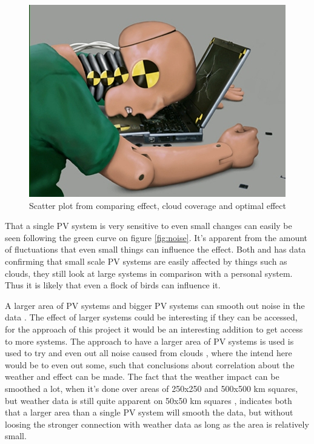 \begin{figure}[h]
  \centering
  \includegraphics{dummy.jpg}
  \caption{Scatter plot from comparing effect, cloud coverage and
    optimal effect}
  \label{fig:fractiles}
\end{figure}


That a single PV system is very sensitive to even small changes can
easily be seen following the green curve on figure \ref{fig:noise}.
It's apparent from the amount of fluctuations that even small things
can influence the effect.  Both \citep{cloudTrack} and
\citep{southafrica} has data confirming that small scale PV systems
are easily affected by things such as clouds, they still look at large
systems in comparison with a personal system.  Thus it is likely that
even a flock of birds can influence it.

A larger area of PV systems and bigger PV systems can smooth out noise
in the data \citep{southafrica,cloudTrack}.  The effect of larger
systems could be interesting if they can be accessed, for the approach
of this project it would be an interesting addition to get access to
more systems.  The approach to have a larger area of PV systems is
used is used to try and even out all noise caused from clouds
\citep{southafrica}, where the intend here would be to even out some,
such that conclusions about correlation about the weather and effect
can be made.  The fact that the weather impact can be smoothed a lot,
when it's done over areas of 250x250 and 500x500 km squares, but
weather data is still quite apparent on 50x50 km squares
\citep{southafrica}, indicates both that a larger area than a single
PV system will smooth the data, but without loosing the stronger
connection with weather data as long as the area is relatively small.

